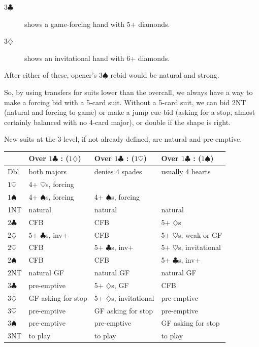 \documentclass{article}
\newcommand{\sz}{\spadesuit}
\newcommand{\hz}{\heartsuit}
\newcommand{\dz}{\diamondsuit}
\newcommand{\cz}{\clubsuit}
\newcommand{\st}{\rule{0pt}{4mm}}
\begin{document}
\begin{description}
\item[3$\cz$] shows a game-forcing hand with 5+ diamonds.
\item[3$\dz$] shows an invitational hand with 6+ diamonds.
\end{description}
After either of these, opener's $3\sz$ rebid would be natural and strong.

So, by using transfers for suits lower than the overcall, we always have a way to make a forcing bid with a 5-card suit. Without a 5-card suit, we can bid 2NT (natural and forcing to game) or make a jump cue-bid (asking for a stop, almost certainly balanced with no 4-card major), or double if the shape is right.

New suits at the 3-level, if not already defined, are natural and pre-emptive.

\begin{center}
\begin{tabular}{|l|p{3cm}|p{3cm}|p{3cm}|} \hline
 & \st Over $1\cz$ : ($1\dz$) & Over $1\cz$ : ($1\hz$) & Over $1\cz$ : ($1\sz$) \\ \hline
Dbl & \st both majors & denies 4 spades & usually 4 hearts  \\ \hline
$1\hz$ & \st 4+ $\hz$s, forcing & & \\ \hline
$1\sz$ & \st 4+ $\sz$s, forcing & 4+ $\sz$s, forcing & \\ \hline
1NT & \st natural & natural & natural \\ \hline
$2\cz$ & \st CFB & CFB & 5+ $\dz$s \\ \hline
$2\dz$ & \st 5+ $\cz$s, inv+ & CFB & 5+ $\hz$s, weak or GF \\ \hline
$2\hz$ & \st CFB & 5+ $\cz$s, inv+ & 5+ $\hz$s, invitational \\ \hline
$2\sz$ & \st CFB & CFB & 5+ $\cz$s, inv+ \\ \hline
2NT & \st natural GF & natural GF & natural GF \\ \hline
$3\cz$ & \st pre-emptive & 5+ $\dz$s, GF & CFB \\ \hline
$3\dz$ & \st GF asking for stop & 5+ $\dz$s, invitational & pre-emptive \\ \hline
$3\hz$ & \st pre-emptive & GF asking for stop & pre-emptive \\ \hline
$3\sz$ & \st pre-emptive & pre-emptive & GF asking for stop \\ \hline
3NT & \st to play & to play & to play \\ \hline
\end{tabular}
\end{center}
\end{document}

